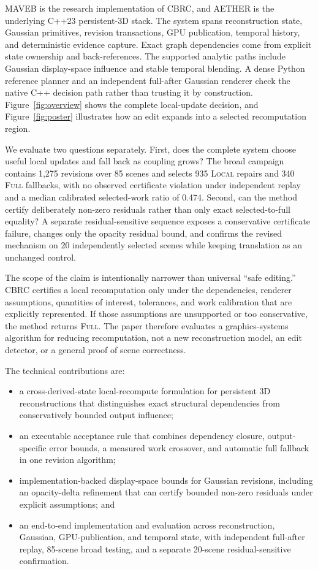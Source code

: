 \documentclass[acmtog,nonacm]{acmart}
\newcommand{\method}{CBRC}
\newcommand{\system}{MAVEB}
\newcommand{\platform}{AETHER}
\newcommand{\FULL}{\textsc{Full}}
\newcommand{\LOCAL}{\textsc{Local}}
\begin{document}
\system{} is the research implementation of \method{}, and \platform{} is the underlying C++23 persistent-3D stack. The system spans reconstruction state, Gaussian primitives, revision transactions, GPU publication, temporal history, and deterministic evidence capture. Exact graph dependencies come from explicit state ownership and back-references. The supported analytic paths include Gaussian display-space influence and stable temporal blending. A dense Python reference planner and an independent full-after Gaussian renderer check the native C++ decision path rather than trusting it by construction. Figure~\ref{fig:overview} shows the complete local-update decision, and Figure~\ref{fig:poster} illustrates how an edit expands into a selected recomputation region.

We evaluate two questions separately. First, does the complete system choose useful local updates and fall back as coupling grows? The broad campaign contains 1,275 revisions over 85 scenes and selects 935 \LOCAL{} repairs and 340 \FULL{} fallbacks, with no observed certificate violation under independent replay and a median calibrated selected-work ratio of 0.474. Second, can the method certify deliberately non-zero residuals rather than only exact selected-to-full equality? A separate residual-sensitive sequence exposes a conservative certificate failure, changes only the opacity residual bound, and confirms the revised mechanism on 20 independently selected scenes while keeping translation as an unchanged control.

The scope of the claim is intentionally narrower than universal ``safe editing.'' \method{} certifies a local recomputation only under the dependencies, renderer assumptions, quantities of interest, tolerances, and work calibration that are explicitly represented. If those assumptions are unsupported or too conservative, the method returns \FULL{}. The paper therefore evaluates a graphics-systems algorithm for reducing recomputation, not a new reconstruction model, an edit detector, or a general proof of scene correctness.

The technical contributions are:
\begin{itemize}
    \item a cross-derived-state local-recompute formulation for persistent 3D reconstructions that distinguishes exact structural dependencies from conservatively bounded output influence;
    \item an executable acceptance rule that combines dependency closure, output-specific error bounds, a measured work crossover, and automatic full fallback in one revision algorithm;
    \item implementation-backed display-space bounds for Gaussian revisions, including an opacity-delta refinement that can certify bounded non-zero residuals under explicit assumptions; and
    \item an end-to-end implementation and evaluation across reconstruction, Gaussian, GPU-publication, and temporal state, with independent full-after replay, 85-scene broad testing, and a separate 20-scene residual-sensitive confirmation.
\end{itemize}
\end{document}

